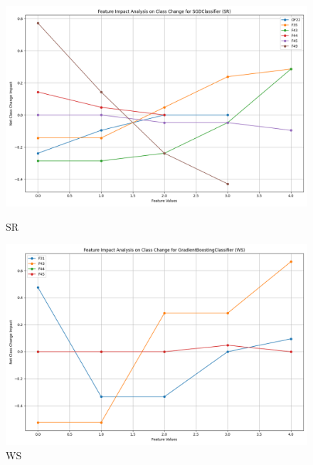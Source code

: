 \begin{figure}[H]
    \centering
    \begin{minipage}{0.495\textwidth}
        \centering
        \includegraphics[width=\linewidth]{analysis/images/feature_impact_class_change_SR_SGDClassifier.png}
        \caption{SR}
        \label{fig:sr_class_analysis}
    \end{minipage}\hfill
    \begin{minipage}{0.495\textwidth}
        \centering
        \includegraphics[width=\linewidth]{analysis/images/feature_impact_class_change_WS_GradientBoostingClassifier.png}
        \caption{WS}
        \label{fig:ws_class_analysis}
    \end{minipage}
\end{figure}

